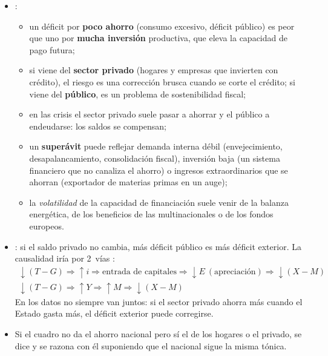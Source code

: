 \documentclass[11pt]{article}
\begin{document}
\begin{itemize}
\item {}:
  \begin{itemize}
  \item un déficit por \textbf{poco ahorro} (consumo excesivo, déficit público) es peor que uno por \textbf{mucha inversión} productiva, que eleva la capacidad de pago futura;
  \item si viene del \textbf{sector privado} (hogares y empresas que invierten con crédito), el riesgo es una corrección brusca cuando se corte el crédito; si viene del \textbf{público}, es un problema de sostenibilidad fiscal;
  \item en las crisis el sector privado suele pasar a ahorrar y el público a endeudarse: los saldos se compensan;
  \item un \textbf{superávit} puede reflejar demanda interna débil (envejecimiento, desapalancamiento, consolidación fiscal), inversión baja (un sistema financiero que no canaliza el ahorro) o ingresos extraordinarios que se ahorran (exportador de materias primas en un auge);
  \item la \emph{volatilidad} de la capacidad de financiación suele venir de la balanza energética, de los beneficios de las multinacionales o de los fondos europeos.
  \end{itemize}
\item {}: si el saldo privado no cambia, más déficit público es más déficit exterior. La causalidad iría por 2~vías :
\[
\begin{gathered}
\downarrow(T-G)\Rightarrow\uparrow i\Rightarrow\text{entrada de capitales}\Rightarrow\downarrow E\ (\text{apreciación})\Rightarrow\downarrow(X-M)\\
\downarrow(T-G)\Rightarrow\uparrow Y\Rightarrow\uparrow M\Rightarrow\downarrow(X-M)
\end{gathered}
\]
  En los datos no siempre van juntos: si el sector privado ahorra más cuando el Estado gasta más, el déficit exterior puede corregirse.
\item Si el cuadro no da el ahorro nacional pero sí el de los hogares o el privado, se dice y se razona con él suponiendo que el nacional sigue la misma tónica.
\end{itemize}
\end{document}
